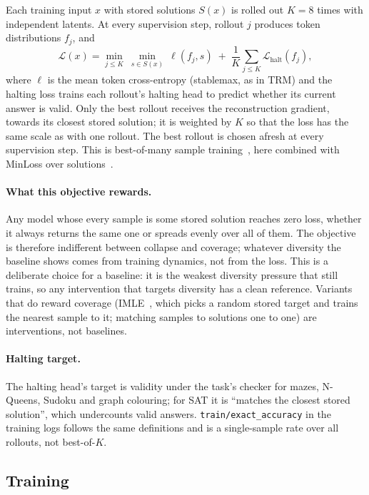 \documentclass[11pt]{article}
\begin{document}
Each training input $x$ with stored solutions $S(x)$ is rolled out $K=8$ times with independent latents. At every
supervision step, rollout $j$ produces token distributions $f_j$, and
\begin{equation}
  \mathcal{L}(x) = \min_{j\le K}\ \min_{s\in S(x)}\ \ell(f_j, s)
  \;+\; \frac1K\sum_{j\le K} \mathcal{L}_{\text{halt}}(f_j),
\end{equation}
where $\ell$ is the mean token cross-entropy (stablemax, as in TRM) and the halting loss trains each rollout's halting
head to predict whether its current answer is valid. Only the best rollout receives the reconstruction gradient,
towards its closest stored solution; it is weighted by $K$ so that the loss has the same scale as with one rollout.
The best rollout is chosen afresh at every supervision step. This is best-of-many sample
training~\cite{bhattacharyya2018bestofmany}, here combined with MinLoss over solutions~\cite{nandwani2021oneofmany}.

\paragraph{What this objective rewards.} Any model whose every sample is some stored solution reaches zero loss,
whether it always returns the same one or spreads evenly over all of them. The objective is therefore indifferent
between collapse and coverage; whatever diversity the baseline shows comes from training dynamics, not from the loss.
This is a deliberate choice for a baseline: it is the weakest diversity pressure that still trains, so any
intervention that targets diversity has a clean reference. Variants that do reward coverage (IMLE~\cite{li2018imle},
which picks a random stored target and trains the nearest sample to it; matching samples to solutions one to one) are
interventions, not baselines.

\paragraph{Halting target.} The halting head's target is validity under the task's checker for mazes, N-Queens,
Sudoku and graph colouring; for SAT it is ``matches the closest stored solution'', which undercounts valid answers.
\texttt{train/exact\_accuracy} in the training logs follows the same definitions and is a single-sample rate over all
rollouts, not best-of-$K$.

\subsection{Training}
\end{document}
